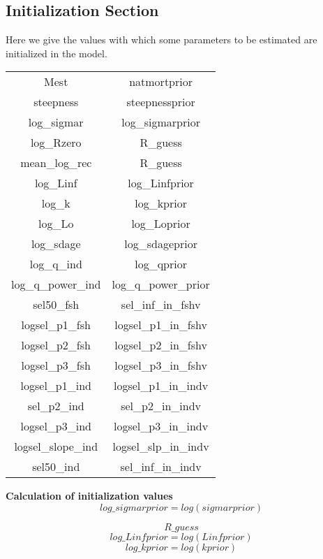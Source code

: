\documentclass{article}
\begin{document}
\subsection{Initialization Section}
Here we give the values with which some parameters to be estimated are initialized in the model.

\begin{tabular}{c c}
    Mest & natmortprior \\
     steepness & steepnessprior\\
     log\_sigmar & log\_sigmarprior \\
     log\_Rzero &    R\_guess\\
     mean\_log\_rec 
 & R\_guess\\
 log\_Linf  &  log\_Linfprior\\
  log\_k &       log\_kprior\\
  log\_Lo &      log\_Loprior\\
  log\_sdage &  log\_sdageprior\\
   log\_q\_ind & log\_qprior\\ 
  log\_q\_power\_ind & log\_q\_power\_prior\\
  sel50\_fsh & sel\_inf\_in\_fshv\\
  logsel\_p1\_fsh &   logsel\_p1\_in\_fshv \\
  logsel\_p2\_fsh &   logsel\_p2\_in\_fshv\\
  logsel\_p3\_fsh &  logsel\_p3\_in\_fshv \\
  logsel\_p1\_ind &   logsel\_p1\_in\_indv \\
  sel\_p2\_ind  &       sel\_p2\_in\_indv \\
  logsel\_p3\_ind &   logsel\_p3\_in\_indv\\
  logsel\_slope\_ind & logsel\_slp\_in\_indv \\
  sel50\_ind & sel\_inf\_in\_indv 
\end{tabular}


\textbf{Calculation of initialization values}\\
\begin{equation}
log\_sigmarprior = log(sigmarprior)
\end{equation}

\begin{equation} R\_guess
\end{equation}
\begin{equation}
log\_Linfprior = log(Linfprior)
\end{equation}
\begin{equation}
    log\_kprior = log(kprior)
\end{equation}
\end{document}
